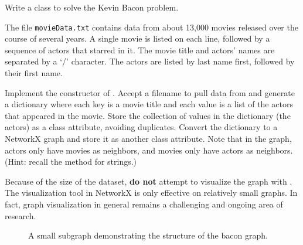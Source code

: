 \begin{problem}
Write a  class to solve the Kevin Bacon problem.

The file \texttt{movieData.txt} contains data from about 13,000 movies released over the course of several years.
A single movie is listed on each line, followed by a sequence of actors that starred in it.
The movie title and actors' names are separated by a `/' character.
The actors are listed by last name first, followed by their first name.

Implement the constructor of .
Accept a filename to pull data from and generate a dictionary where each key is a movie title and each value is a list of the actors that appeared in the movie.
Store the collection of values in the dictionary (the actors) as a class attribute, avoiding duplicates.
Convert the dictionary to a NetworkX graph and store it as another class attribute.
Note that in the graph, actors only have movies as neighbors, and movies only have actors as neighbors.
\\(Hint: recall the  method for strings.)
\end{problem}

\begin{warn}
Because of the size of the dataset, \textbf{do not} attempt to visualize the graph with .
The visualization tool in NetworkX is only effective on relatively small graphs.
In fact, graph visualization in general remains a challenging and ongoing area of research.
\end{warn}

\begin{figure}
\centering
{}
\caption{A small subgraph demonstrating the structure of the bacon graph.}
\label{fig:bacon_graph}
\end{figure}

